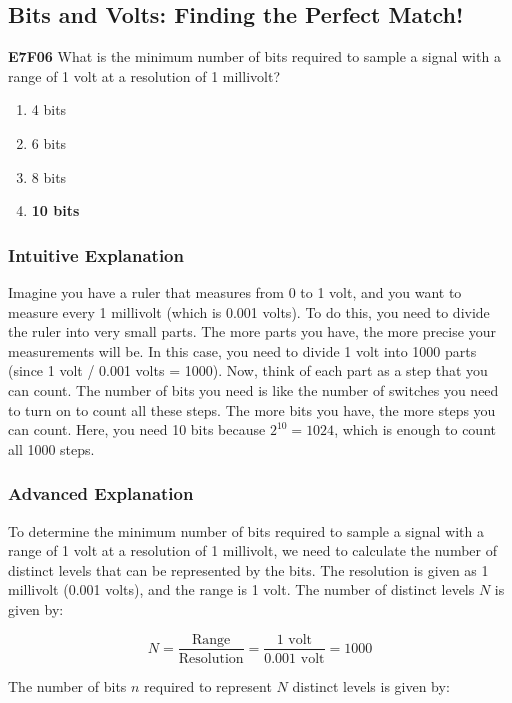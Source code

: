 \subsection{Bits and Volts: Finding the Perfect Match!}
\label{sec:E7F06}

\begin{tcolorbox}[colback=blue!5!white,colframe=blue!75!black,title=E7F06]
\textbf{E7F06} What is the minimum number of bits required to sample a signal with a range of 1 volt at a resolution of 1 millivolt?
\begin{enumerate}[label=\Alph*)]
    \item 4 bits
    \item 6 bits
    \item 8 bits
    \item \textbf{10 bits}
\end{enumerate}
\end{tcolorbox}

\subsubsection{Intuitive Explanation}
Imagine you have a ruler that measures from 0 to 1 volt, and you want to measure every 1 millivolt (which is 0.001 volts). To do this, you need to divide the ruler into very small parts. The more parts you have, the more precise your measurements will be. In this case, you need to divide 1 volt into 1000 parts (since 1 volt / 0.001 volts = 1000). Now, think of each part as a step that you can count. The number of bits you need is like the number of switches you need to turn on to count all these steps. The more bits you have, the more steps you can count. Here, you need 10 bits because \(2^{10} = 1024\), which is enough to count all 1000 steps.

\subsubsection{Advanced Explanation}
To determine the minimum number of bits required to sample a signal with a range of 1 volt at a resolution of 1 millivolt, we need to calculate the number of distinct levels that can be represented by the bits. The resolution is given as 1 millivolt (0.001 volts), and the range is 1 volt. The number of distinct levels \(N\) is given by:

\[
N = \frac{\text{Range}}{\text{Resolution}} = \frac{1 \text{ volt}}{0.001 \text{ volt}} = 1000
\]

The number of bits \(n\) required to represent \(N\) distinct levels is given by:


